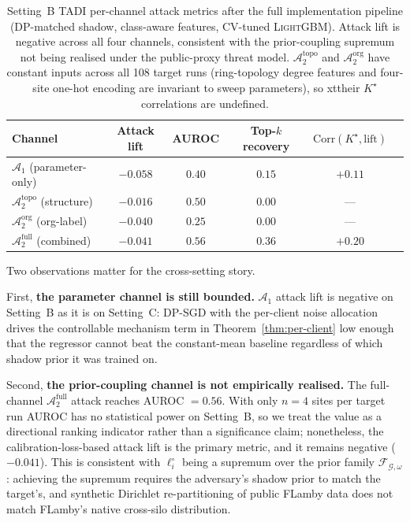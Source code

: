 \documentclass[letterpaper,journal]{IEEEtran}
\newcommand{\TADI}{\textsc{TADI}\xspace}
\newcommand{\Adv}{\mathcal{A}}
\newcommand{\TOPO}{\mathcal{G}}
\newcommand{\FAM}{\mathcal{F}}
\begin{document}
\begin{table}[h]
\centering
\begin{tabular}{@{}lccccc@{}}
\toprule
Channel & Attack lift & AUROC & Top-$k$ recovery & $\mathrm{Corr}(K^\star, \text{lift})$ \\
\midrule
$\Adv_1$ (parameter-only)          & $-0.058$ & $0.40$ & $0.15$ & $+0.11$ \\
$\Adv_2^{\text{topo}}$ (structure) & $-0.016$ & $0.50$ & $0.00$ & ---     \\
$\Adv_2^{\text{org}}$ (org-label)  & $-0.040$ & $0.25$ & $0.00$ & ---     \\
$\Adv_2^{\text{full}}$ (combined)  & $-0.041$ & $\mathbf{0.56}$ & $0.36$ & $+0.20$ \\
\bottomrule
\end{tabular}
\caption{Setting~B \TADI per-channel attack metrics after the full
implementation pipeline (DP-matched shadow, class-aware features,
CV-tuned \textsc{LightGBM}). Attack lift is negative across all four
channels, consistent with the prior-coupling supremum not being
realised under the public-proxy threat model.
$\Adv_2^{\text{topo}}$ and $\Adv_2^{\text{org}}$ have constant inputs
across all 108 target runs (ring-topology degree features and
four-site one-hot encoding are invariant to sweep parameters), so
xttheir $K^\star$ correlations are undefined.}
\label{tab:channels-b}
\end{table}

Two observations matter for the cross-setting story.

First, \textbf{the parameter channel is still bounded.} $\Adv_1$
attack lift is negative on Setting~B as it is on Setting~C: DP-SGD
with the per-client noise allocation drives the controllable mechanism
term in Theorem~\ref{thm:per-client} low enough that the regressor
cannot beat the constant-mean baseline regardless of which shadow prior
it was trained on.

Second, \textbf{the prior-coupling channel is not empirically
realised.} The full-channel $\Adv_2^{\text{full}}$ attack reaches
AUROC $= 0.56$. With only $n=4$ sites per target run AUROC has no
statistical power on Setting~B, so we treat the value as a directional
ranking indicator rather than a significance claim; nonetheless, the
calibration-loss-based attack lift is the primary metric, and it
remains negative ($-0.041$). This is consistent with
$\ell_i^\circ$ being a supremum over the prior family
$\FAM_{\TOPO,\omega}$: achieving the supremum requires the
adversary's shadow prior to match the target's, and synthetic
Dirichlet re-partitioning of public FLamby data does not match
FLamby's native cross-silo distribution.
\end{document}
